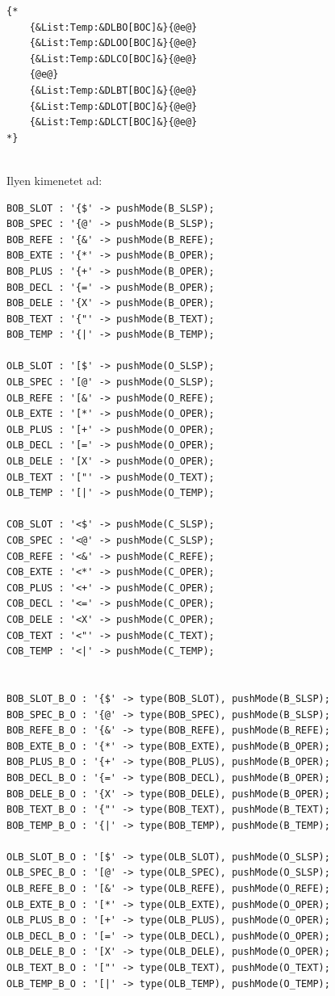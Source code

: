 \begin{verbatim}
{*
	{&List:Temp:&DLBO[BOC]&}{@e@}
	{&List:Temp:&DLOO[BOC]&}{@e@}
	{&List:Temp:&DLCO[BOC]&}{@e@}
	{@e@}
	{&List:Temp:&DLBT[BOC]&}{@e@}
	{&List:Temp:&DLOT[BOC]&}{@e@}
	{&List:Temp:&DLCT[BOC]&}{@e@}
*}


\end{verbatim}

Ilyen kimenetet ad:

\begin{verbatim}
BOB_SLOT : '{$' -> pushMode(B_SLSP);
BOB_SPEC : '{@' -> pushMode(B_SLSP);
BOB_REFE : '{&' -> pushMode(B_REFE);
BOB_EXTE : '{*' -> pushMode(B_OPER);
BOB_PLUS : '{+' -> pushMode(B_OPER);
BOB_DECL : '{=' -> pushMode(B_OPER);
BOB_DELE : '{X' -> pushMode(B_OPER);
BOB_TEXT : '{"' -> pushMode(B_TEXT);
BOB_TEMP : '{|' -> pushMode(B_TEMP);

OLB_SLOT : '[$' -> pushMode(O_SLSP);
OLB_SPEC : '[@' -> pushMode(O_SLSP);
OLB_REFE : '[&' -> pushMode(O_REFE);
OLB_EXTE : '[*' -> pushMode(O_OPER);
OLB_PLUS : '[+' -> pushMode(O_OPER);
OLB_DECL : '[=' -> pushMode(O_OPER);
OLB_DELE : '[X' -> pushMode(O_OPER);
OLB_TEXT : '["' -> pushMode(O_TEXT);
OLB_TEMP : '[|' -> pushMode(O_TEMP);

COB_SLOT : '<$' -> pushMode(C_SLSP);
COB_SPEC : '<@' -> pushMode(C_SLSP);
COB_REFE : '<&' -> pushMode(C_REFE);
COB_EXTE : '<*' -> pushMode(C_OPER);
COB_PLUS : '<+' -> pushMode(C_OPER);
COB_DECL : '<=' -> pushMode(C_OPER);
COB_DELE : '<X' -> pushMode(C_OPER);
COB_TEXT : '<"' -> pushMode(C_TEXT);
COB_TEMP : '<|' -> pushMode(C_TEMP);


BOB_SLOT_B_O : '{$' -> type(BOB_SLOT), pushMode(B_SLSP);
BOB_SPEC_B_O : '{@' -> type(BOB_SPEC), pushMode(B_SLSP);
BOB_REFE_B_O : '{&' -> type(BOB_REFE), pushMode(B_REFE);
BOB_EXTE_B_O : '{*' -> type(BOB_EXTE), pushMode(B_OPER);
BOB_PLUS_B_O : '{+' -> type(BOB_PLUS), pushMode(B_OPER);
BOB_DECL_B_O : '{=' -> type(BOB_DECL), pushMode(B_OPER);
BOB_DELE_B_O : '{X' -> type(BOB_DELE), pushMode(B_OPER);
BOB_TEXT_B_O : '{"' -> type(BOB_TEXT), pushMode(B_TEXT);
BOB_TEMP_B_O : '{|' -> type(BOB_TEMP), pushMode(B_TEMP);

OLB_SLOT_B_O : '[$' -> type(OLB_SLOT), pushMode(O_SLSP);
OLB_SPEC_B_O : '[@' -> type(OLB_SPEC), pushMode(O_SLSP);
OLB_REFE_B_O : '[&' -> type(OLB_REFE), pushMode(O_REFE);
OLB_EXTE_B_O : '[*' -> type(OLB_EXTE), pushMode(O_OPER);
OLB_PLUS_B_O : '[+' -> type(OLB_PLUS), pushMode(O_OPER);
OLB_DECL_B_O : '[=' -> type(OLB_DECL), pushMode(O_OPER);
OLB_DELE_B_O : '[X' -> type(OLB_DELE), pushMode(O_OPER);
OLB_TEXT_B_O : '["' -> type(OLB_TEXT), pushMode(O_TEXT);
OLB_TEMP_B_O : '[|' -> type(OLB_TEMP), pushMode(O_TEMP);


\end{verbatim}

